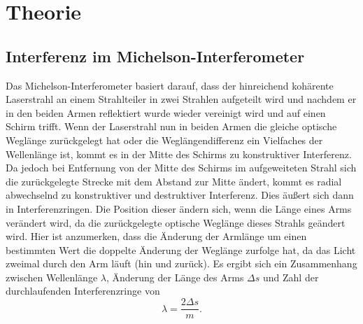 \documentclass[
	a4paper,
	12pt,
	pagesize,
	ngerman
]{scrartcl}
\begin{document}
	\section{Theorie}
	\subsection{Interferenz im Michelson-Interferometer}
	Das Michelson-Interferometer basiert darauf, dass der hinreichend kohärente Laserstrahl an einem Strahlteiler in zwei Strahlen aufgeteilt wird und nachdem er in den beiden Armen reflektiert wurde wieder vereinigt wird und auf einen Schirm trifft.
	Wenn der Laserstrahl nun in beiden Armen die gleiche optische Weglänge zurückgelegt hat oder die Weglängendifferenz ein Vielfaches der Wellenlänge ist, kommt es in der Mitte des Schirms zu konstruktiver Interferenz.
	Da jedoch bei Entfernung von der Mitte des Schirms im aufgeweiteten Strahl sich die zurückgelegte Strecke mit dem Abstand zur Mitte ändert, kommt es radial abwechselnd zu konstruktiver und destruktiver Interferenz.
	Dies äußert sich dann in Interferenzringen.
	Die Position dieser ändern sich, wenn die Länge eines Arms verändert wird, da die zurückgelegte optische Weglänge dieses Strahls geändert wird.
	Hier ist anzumerken, dass die Änderung der Armlänge um einen bestimmten Wert die doppelte Änderung der Weglänge zurfolge hat, da das Licht zweimal durch den Arm läuft (hin und zurück).
	Es ergibt sich ein Zusammenhang zwischen Wellenlänge $\lambda$, Änderung der Länge des Arms $\Delta s$ und Zahl der durchlaufenden Interferenzringe von %
	\begin{equation}
		\lambda = \frac{2 \Delta s}{m}.
		\label{eq_wellenlaenge}
	\end{equation}
\end{document}
